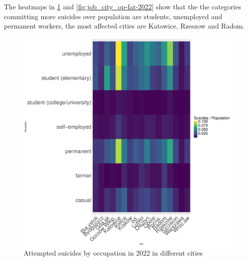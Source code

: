 \documentclass{article}
\begin{document}
The heatmaps in \ref{fig:job_city_op-att-2022} and \ref{fig:job_city_op-fat-2022}
show that the the categories committing more suicides over population are students,
unemployed and permanent workers, the most affected cities are Katowice, Rzeszow and Radom.
\begin{figure}[H]
    \centering
    \begin{minipage}{0.65\textwidth}
        \includegraphics[width=\textwidth]{imgs/job_city_op-att-2022.pdf}
        \caption{Attempted suicides by occupation in 2022 in different cities}
	\label{fig:job_city_op-att-2022}
    \end{minipage}
    \hfill
    \begin{minipage}{0.65\textwidth}

\end{minipage}
\end{figure}
\end{document}
